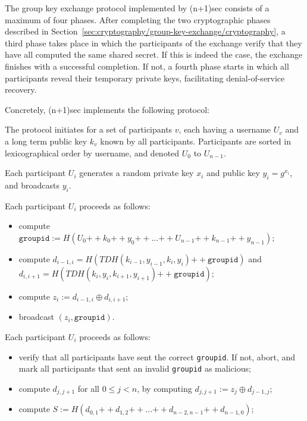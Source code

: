 \documentclass{article}
\def\concat{\mathbin{+\!\!\!+}}
\def\xor{\oplus}
\begin{document}
The group key exchange protocol implemented by (n+1)sec consists of a maximum of four phases.
After completing the two cryptographic phases described in Section~\ref{sec:cryptography/group-key-exchange/cryptography}, a third phase takes place in which the participants of the exchange verify that they have all computed the same shared secret.
If this is indeed the case, the exchange finishes with a successful completion.
If not, a fourth phase starts in which all participants reveal their temporary private keys, facilitating denial-of-service recovery.

Concretely, (n+1)sec implements the following protocol:
\begin{description}[noitemsep]
\item[Participants.] The protocol initiates for a set of participants $v$, each having a username $U_v$ and a long term public key $k_v$ known by all participants. Participants are sorted in lexicographical order by username, and denoted $U_0$ to $U_{n-1}$.
\item[Round 1.] Each participant $U_i$ generates a random private key $x_i$ and public key $y_i = g^{x_i}$, and broadcasts $y_i$.
\item[Round 2.] Each participant $U_i$ proceeds as follows:
	\begin{itemize}[noitemsep,nolistsep]\renewcommand{\labelitemi}{--}
	\item compute $\texttt{groupid} := H(U_0 \concat k_0 \concat y_0 \concat \ldots \concat U_{n-1} \concat k_{n-1} \concat y_{n-1})$;
	\item compute $d_{i-1, i} = H(TDH(k_{i-1}, y_{i-1}, k_i, y_i) \concat \texttt{groupid})$ and $d_{i, i+1} = H(TDH(k_i, y_i, k_{i+1}, y_{i+1}) \concat \texttt{groupid})$;
	\item compute $z_i := d_{i-1, i} \xor d_{i, i+1}$;
	\item broadcast $(z_i, \texttt{groupid})$.
	\end{itemize}
\item[Round 3.] Each participant $U_i$ proceeds as follows:
	\begin{itemize}[noitemsep,nolistsep]\renewcommand{\labelitemi}{--}
	\item verify that all participants have sent the correct \texttt{groupid}. If not, abort, and mark all participants that sent an invalid \texttt{groupid} as malicious;
	\item compute $d_{j, j+1}$ for all $0 \leq j < n$, by computing $d_{j, j+1} := z_j \xor d_{j-1, j}$;
	\item compute $S := H(d_{0, 1} \concat d_{1, 2} \concat \ldots \concat d_{n-2, n-1} \concat d_{n-1, 0})$;

\end{itemize}
\end{description}
\end{document}
